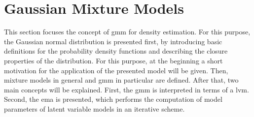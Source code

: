 \section{Gaussian Mixture Models}

This section focuses the concept of \acrshort{gmm} for density estimation. For this purpose, the Gaussian normal distribution is presented first, by introducing basic definitions for the probability density functions and describing the closure properties of the distribution. For this purpose, at the beginning a short motivation for the application of the presented model will be given. Then, mixture models in general and \acrshort{gmm} in particular are defined. After that, two main concepts will be explained. First, the \acrshort{gmm} is interpreted in terms of a \acrshort{lvm}. Second, the \acrshort{ema} is presented, which performs the computation of model parameters of latent variable models in an iterative scheme.


\newpage
% 

